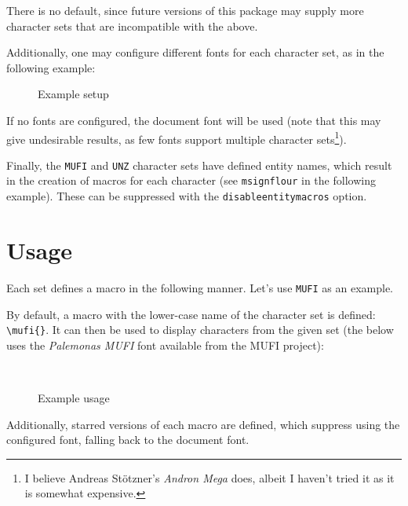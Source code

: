 \documentclass{article}
\begin{document}
There is no default, since future versions of this package may supply more character sets that are incompatible with the above.

Additionally, one may configure different fonts for each character set, as in the following example:

\begin{figure}[H]
\centering
\begin{verbatimtab}
\usepackage[
	MUFI,
	TITUS,
	fonts={
		MUFI=\mufifont,
		TITUS=\titusfont,
	},
]{unicode-alphabets}
\end{verbatimtab}
\caption{Example setup}
\end{figure}

If no fonts are configured, the document font will be used (note that this may give undesirable results, as few fonts support multiple character sets\footnote{I believe Andreas Stötzner's \emph{Andron Mega} does, albeit I haven't tried it as it is somewhat expensive.}).

Finally, the \verb|MUFI| and \verb|UNZ| character sets have defined entity names, which result in the creation of macros for each character (see \verb|msignflour| in the following example). These can be suppressed with the \verb|disableentitymacros| option.

\section{Usage}

Each set defines a macro in the following manner. Let's use \verb|MUFI| as an example.

By default, a macro with the lower-case name of the character set is defined: \verb|\mufi{}|. It can then be used to display characters from the given set (the below uses the \emph{Palemonas MUFI} font available from the MUFI project):

\begin{figure}[H]
\centering
\begin{LTXexample}[varwidth=true]
\\
\msignflour{}
\end{LTXexample}
\caption{Example usage}
\end{figure}

Additionally, starred versions of each macro are defined, which suppress using the configured font, falling back to the document font.

\printbibliography
\end{document}
